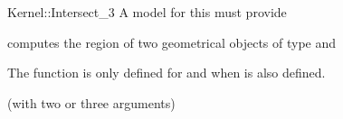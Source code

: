 \begin{ccRefFunctionObjectConcept}{Kernel::Intersect_3}
A model for this must provide


{computes the  region of two geometrical objects of type 
 and }

The function is only defined for  and 
when  is also defined.

\ccRefines
{} (with two or three arguments)

\ccSeeAlso
{}\\
\\

\end{ccRefFunctionObjectConcept}
